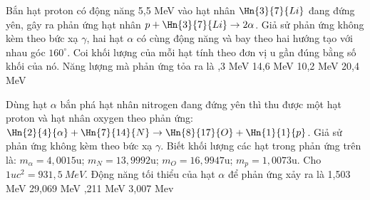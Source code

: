 \begin{vidu}%
 Bắn hạt proton có động năng 5,5 MeV vào hạt nhân $\Hn{3}{7}{Li}$ đang đứng yên, gây ra phản ứng hạt nhân $p+\Hn{3}{7}{Li}\rightarrow 2\alpha $. Giả sử phản ứng không kèm theo bức xạ $\gamma $, hai hạt $\alpha $ có cùng động năng và bay theo hai hướng tạo với nhau góc $160^\circ$. Coi khối lượng của mỗi hạt tính theo đơn vị u gần đúng bằng số khối của nó. Năng lượng mà phản ứng tỏa ra là
\choice
{,3 MeV}
{14,6 MeV}
{10,2 MeV}
{20,4 MeV}
\end{vidu}
\begin{vidu}%
 Dùng hạt $\alpha$ bắn phá hạt nhân nitrogen đang đứng yên thì thu được một hạt proton và hạt nhân oxygen theo phản ứng: $\Hn{2}{4}{\alpha} +\Hn{7}{14}{N}\rightarrow\Hn{8}{17}{O}+\Hn{1}{1}{p}$. Giả sử phản ứng không kèm theo bức xạ $\gamma$. Biết khối lượng các hạt trong phản ứng trên là: $m_ {\alpha} = 4,0015$u; $m_ {N} = 13,9992$u; $m_ {O} = 16,9947$u; $m_p= 1,0073$u. Cho $1uc^2=931,5\ MeV$. Động năng tối thiểu của hạt $\alpha$ để phản ứng xảy ra là
\choice
{1,503 MeV}
{29,069 MeV}
{,211 MeV}
{3,007 Mev}
\end{vidu}
